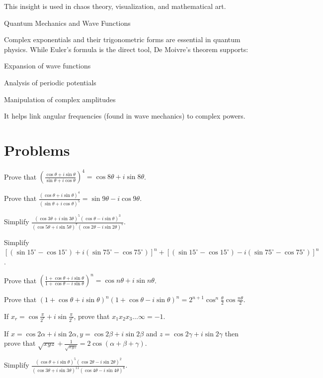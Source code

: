   This insight is used in chaos theory, visualization, and mathematical art.
\item Quantum Mechanics and Wave Functions

  Complex exponentials and their trigonometric forms are essential in quantum physics. While Euler’s formula
  is the direct tool, De Moivre’s theorem supports:

  \startitemize[i]
\item Expansion of wave functions
\item Analysis of periodic potentials
\item Manipulation of complex amplitudes
  \stopitemize

  It helps link angular frequencies (found in wave mechanics) to complex powers.
\stopitemize

\section{Problems}
\startitemize[n, 1*broad]
\item Prove that $\left(\frac{\cos\theta + i\sin\theta}{\sin\theta + i\cos\theta}\right)^4 = \cos8\theta +
  i\sin8\theta$.
\item Prove that $\frac{(\cos\theta + i\sin\theta)^4}{(\sin\theta + i\cos\theta)^5} = \sin9\theta -
  i\cos9\theta$.
\item Simplify $\frac{(\cos3\theta + i\sin3\theta)^5(\cos\theta - i\sin\theta)^3}{(\cos5\theta +
  i\sin5\theta)^7(\cos2\theta - i\sin2\theta)^5}$.
\item Simplify $[(\sin15^\circ - \cos15^\circ) + i(\sin75^\circ - \cos75^\circ)]^n + [(\sin15^\circ -
  \cos15^\circ) - i(\sin75^\circ - \cos75^\circ)]^n$.\
\item Prove that $\left(\frac{1 + \cos\theta + i\sin\theta}{1 + \cos\theta - i\sin\theta}\right)^n =
  \cos n\theta + i\sin n\theta$.
\item Prove that $(1 + \cos\theta + i\sin\theta)^n(1 + \cos\theta - i\sin\theta)^n = 2^{n +
  1}\cos^n\frac{\theta}{2}\cos\frac{n\theta}{2}$.
\item If $x_r = \cos\frac{\pi}{2^r} + i\sin\frac{\pi}{2^r}$, prove that $x_1x_2x_3\ldots \infty = -1$.
\item If $x = \cos2\alpha + i\sin2\alpha, y = \cos2\beta + i\sin2\beta$ and $z = \cos2\gamma + i\sin2\gamma$
  then prove that $\sqrt{xyz} + \frac{1}{\sqrt{xyz}} = 2\cos(\alpha + \beta + \gamma)$.
\item Simplify $\frac{(\cos\theta + i\sin\theta)^5(\cos2\theta - i\sin2\theta)^2}{(\cos3\theta +
  i\sin3\theta)^{11}(\cos4\theta - i\sin4\theta)^8}$.
